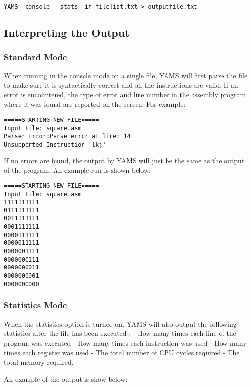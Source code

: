 \begin{verbatim}
YAMS -console --stats -if filelist.txt > outputfile.txt
\end{verbatim}

\subsection{Interpreting the Output}
\subsubsection{Standard Mode}
When running in the console mode on a single file, YAMS will first parse the file to make sure it is syntactically correct and all the instructions are valid.  If an error is encountered, the type of error and line number in the assembly program where it was found are reported on the screen.  For example:

\begin{verbatim}
=====STARTING NEW FILE=====
Input File: square.asm
Parser Error:Parse error at line: 14
Unsupported Instruction 'lkj'
\end{verbatim}

If no errors are found, the output by YAMS will just be the same as the output of the program. An example run is shown below:

\begin{verbatim}
=====STARTING NEW FILE=====
Input File: square.asm
1111111111
0111111111
0011111111
0001111111
0000111111
0000011111
0000001111
0000000111
0000000011
0000000001
0000000000
\end{verbatim}

\subsubsection{Statistics Mode}
When the statistics option is turned on, YAMS will also output the following statistics after the file has been executed :
- How many times each line of the program was executed
- How many times each instruction was used
- How many times each register was used
- The total number of CPU cycles required
- The total memory required.

An example of the output is show below:

